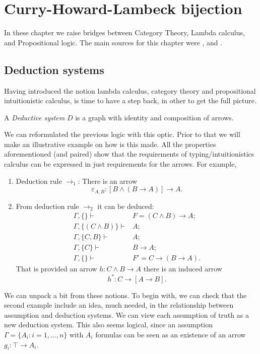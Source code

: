 
\chapter{Curry-Howard-Lambeck bijection}
\thispagestyle{empty}
In these chapter we raise bridges between Category Theory, Lambda calculus, and Propositional logic. The main sources for this chapter were  \cite{lambek1988introduction}, \cite{lambek1985cartesian} and \cite[Chapter 6]{selinger2008lecture}.\\


\section{Deduction systems}
Having introduced the notion lambda calculus, category theory and propositional intuitionistic calculus, is time to have a step back, in other to get the full picture.

\begin{definition}
  A \emph{Deductive system} $D$ is a graph  with identity and composition of arrows.
\end{definition}

We can reformulated the previous logic with this optic. Prior to that we will make an illustrative example on how is this made. All the properties aforementioned (and paired) show that the requirements of typing/intuitionistics calculus can be expressed in just requirements for the arrows. For example, 
\begin{example}
  \begin{enumerate}
  \item Deduction rule $\to_1$: There is an arrow $$\varepsilon_{A,B}: [B\land (B \to A)] \to A.$$
  \item From deduction rule $\to_2$ it can be deduced:
    \begin{align*}
      \Gamma,\{\} \vdash & F= (C\land B)\to A;\\
      \Gamma, \{(C\land B)\} \vdash & A;\\
      \Gamma, \{C, B\} \vdash & A;\\
      \Gamma, \{C\} \vdash & B\to A;\\
      \Gamma, \{\} \vdash & F'=C \to (B \to A).
    \end{align*}
    That is provided an arrow $h: C\land B \to A$ there is an induced arrow
    $$h^*:C \to [A\to B].$$
  \end{enumerate}
\end{example}

We can unpack a bit from these notions. To begin with, we can check that the second example include an idea, much needed, in the relationship between assumption and deduction systems. We can view each assumption of truth as a new deduction system. This also seems logical, since an assumption $\Gamma = \{A_i : i=1,...,n\}$  with $A_i$ formulas can be seen as an existence of an arrow $g_i: \top \to A_i$.\\

